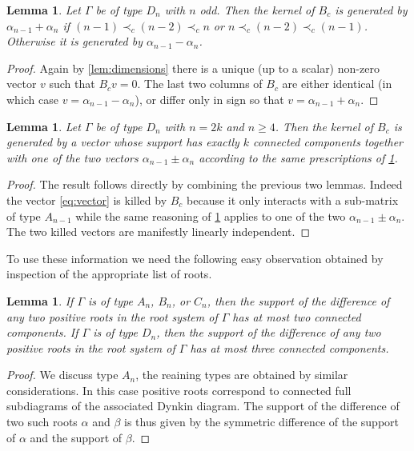 \documentclass[pdftex]{sigma}
\numberwithin{equation}{section}
\numberwithin{figure}{section}
\newtheorem{Lemma}[Theorem]{Lemma}
\begin{document}
  \begin{Lemma}
    \label{lem:ker_Dn_even}
    Let $\Gamma$ be of type $D_n$ with $n$ odd.
    Then the kernel of $B_c$ is generated by $\alpha_{n-1}+\alpha_n$ if $(n-1) \prec_c (n-2) \prec_c n$ or $n \prec_c (n-2) \prec_c (n-1)$.
    Otherwise it is generated by $\alpha_{n-1}-\alpha_n$.
  \end{Lemma}
  \begin{proof}
    Again by \cref{lem:dimensions} there is a unique (up to a scalar) non-zero vector $v$ such that $B_cv=0$.
    The last two columns of $B_c$ are either identical (in which case $v=\alpha_{n-1}-\alpha_n$), or differ only in sign so that $v=\alpha_{n-1}+\alpha_n$.
  \end{proof}

  \begin{Lemma}
    Let $\Gamma$ be of type $D_n$ with $n=2k$ and $n\geq 4$.
    Then the kernel of $B_c$ is generated by a vector whose support has exactly $k$ connected components together with one of the two vectors $\alpha_{n-1}\pm\alpha_n$ according to the same prescriptions of \cref{lem:ker_Dn_even}.
  \end{Lemma}
  \begin{proof}
    The result follows directly by combining the previous two lemmas.
    Indeed the vector \cref{eq:vector} is killed by $B_c$ because it only interacts with a sub-matrix of type $A_{n-1}$ while the same reasoning of \cref{lem:ker_Dn_even} applies to one of the two $\alpha_{n-1}\pm\alpha_n$.
    The two killed vectors are manifestly linearly independent.
  \end{proof}

  To use these information we need the following easy observation obtained by inspection of the appropriate list of roots.
  \begin{Lemma}
    \label{lem:components}
    If $\Gamma$ is of type $A_n$, $B_n$, or $C_n$, then the support of the difference of any two positive roots in the root system of $\Gamma$ has at most two connected components.
    If $\Gamma$ is of type $D_n$, then the support of the difference of any two positive roots in the root system of $\Gamma$ has at most three connected components.
  \end{Lemma}
  \begin{proof}
    We discuss type $A_n$, the reaining types are obtained by similar considerations.
    In this case positive roots correspond to connected full subdiagrams of the associated Dynkin diagram.
    The support of the difference of two such roots $\alpha$ and $\beta$ is thus given by the symmetric difference of the support of $\alpha$ and the support of $\beta$.
  \end{proof}
\end{document}
